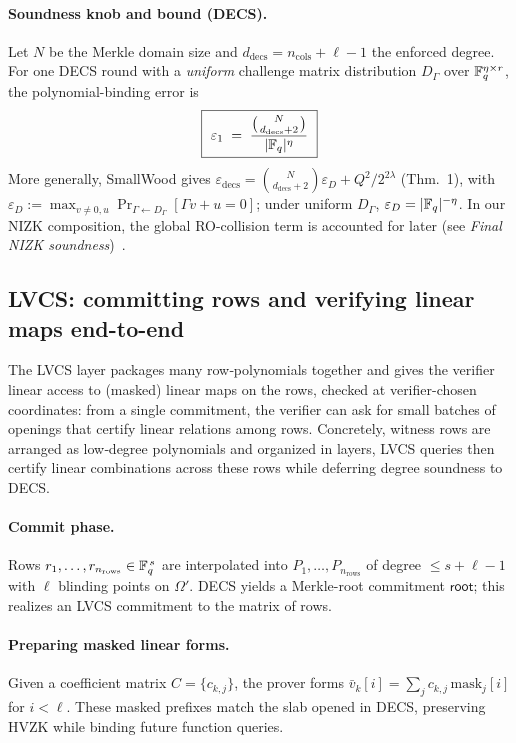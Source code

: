 \paragraph{Soundness knob and bound (DECS).}
Let $N$ be the Merkle domain size and $d_{\mathrm{decs}}=n_{\mathrm{cols}}+\ell-1$ the enforced degree. For one DECS round with a \emph{uniform} challenge matrix distribution $D_\Gamma$ over $\mathbb{F}_q^{\eta\times r}$, the polynomial-binding error is
\[
\boxed{\ \varepsilon_1 \;=\; \frac{\binom{N}{\,d_{\mathrm{decs}}+2\,}}{|\F_q|^{\eta}} \ }
\]
More generally, SmallWood gives $\varepsilon_{\mathrm{decs}}=\binom{N}{d_{\mathrm{decs}}+2}\varepsilon_D + Q^2/2^{2\lambda}$ (Thm.~1), with $\varepsilon_D:=\max_{v\neq 0,u}\Pr_{\Gamma\leftarrow D_\Gamma}[\Gamma v+u=0]$; under uniform $D_\Gamma$, $\varepsilon_D=|\mathbb{F}_q|^{-\eta}$. In our NIZK composition, the global RO-collision term is accounted for later (see \emph{Final NIZK soundness})~\cite[Eq.~(8), Thm.~1]{cryptoeprint:2025/1085}.


\subsection{LVCS: committing rows and verifying linear maps end-to-end}
\label{subsec:lvcs}

The LVCS layer packages many row‑polynomials together and gives the verifier linear access to (masked) linear maps on the rows, checked at verifier-chosen coordinates: from a single commitment, the verifier can ask for small batches of openings that certify linear relations among rows. Concretely, witness rows are arranged as low‑degree polynomials and organized in layers, LVCS queries then certify linear combinations across these rows while deferring degree soundness to DECS.

\paragraph{Commit phase.}
Rows $r_1,\dots,r_{n_{\mathrm{rows}}}\in\mathbb{F}_q^{\,s}$ are interpolated into $P_1,\dots,P_{n_{\mathrm{rows}}}$ of degree $\le s+\ell-1$ with $\ell$ blinding points on $\Omega'$. DECS yields a Merkle-root commitment $\mathsf{root}$; this realizes an LVCS commitment to the matrix of rows.

\paragraph{Preparing masked linear forms.}
Given a coefficient matrix $C=\{c_{k,j}\}$, the prover forms $\bar v_k[i]=\sum_j c_{k,j}\,\mathrm{mask}_j[i]$ for $i<\ell$. These masked prefixes match the slab opened in DECS, preserving HVZK while binding future function queries.

